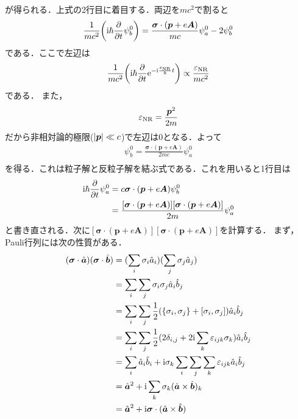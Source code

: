 \documentclass{report}
\begin{document}
が得られる．上式の2行目に着目する．両辺を$mc^2$で割ると
\begin{align}
  \frac{1}{mc^2}\qty(\mathrm{i}\hbar\frac{\partial}{\partial t}\psi_b^0) = \frac{\bm{\sigma}\cdot(\bm{p} + e\bm{A})}{mc}\psi^0_a - 2 \psi^0_b
\end{align}
である．ここで左辺は
\begin{align}
  \frac{1}{mc^2}\qty(\mathrm{i}\hbar\frac{\partial}{\partial t}\mathrm{e}^{-\mathrm{i}\frac{\varepsilon_{\mathrm{NR}}}{\hbar} t}) \propto \frac{\varepsilon_{\mathrm{NR}}}{mc^2}
\end{align}
である．
また，
\begin{align}
  \varepsilon_{\mathrm{NR}} = \frac{\bm{p}^2}{2m}
\end{align}
だから非相対論的極限($\abs{\bm{p}} \ll c$)で左辺は0となる．よって
\begin{align}
  \psi_b^0 = \frac{\bm{\sigma}\cdot(\bm{p} + e\bm{A})}{2mc}\psi^0_a\\
\end{align}
を得る．これは粒子解と反粒子解を結ぶ式である．これを用いると1行目は
\begin{align}
  \mathrm{i}\hbar\frac{\partial}{\partial t}\psi^0_a &= c\bm{\sigma} \cdot (\bm{p} + e\bm{A})\psi_b^0\\
  &= \frac{[\bm{\sigma}\cdot(\bm{p} + e\bm{A})][\bm{\sigma}\cdot(\bm{p} + e\bm{A})]}{2m}\psi^0_a
\end{align}
と書き直される．次に$[\bm{\sigma}\cdot(\bm{p} + e\bm{A})][\bm{\sigma}\cdot(\bm{p} + e\bm{A})]$を計算する．
まず，Pauli行列には次の性質がある．
\begin{align}
  (\bm{\sigma}\cdot\hat{\bm{a}})(\bm{\sigma}\cdot\hat{\bm{b}}) &= (\sum_{i} \sigma_i \hat{a}_i) (\sum_{j} \sigma_j \hat{a}_j)\\
  &= \sum_{i} \sum_{j} \sigma_{i} \sigma_{j} \hat{a}_i \hat{b}_j\\
  &= \sum_{i} \sum_{j} \frac{1}{2}(\qty{\sigma_i, \sigma_j} + [\sigma_i, \sigma_j]) \hat{a}_i \hat{b}_j\\
  &= \sum_{i} \sum_{j} \frac{1}{2}(2 \delta_{i,j} + 2\mathrm{i} \sum_{k} \varepsilon_{ijk} \sigma_k) \hat{a}_i \hat{b}_j\\
  &= \sum_{i} \hat{a}_i \hat{b}_i + \mathrm{i} \sigma_k \sum_{i} \sum_{j} \sum_{k} \varepsilon_{ijk} \hat{a}_i \hat{b}_j\\
  &= \hat{\bm{a}}^2 + \mathrm{i} \sum_{k} \sigma_k (\hat{\bm{a}} \times \hat{\bm{b}})_k\\
  &= \hat{\bm{a}}^2 + \mathrm{i} \bm{\sigma} \cdot (\hat{\bm{a}} \times \hat{\bm{b}}) \label{pauli-inner-product}
\end{align}
\end{document}
